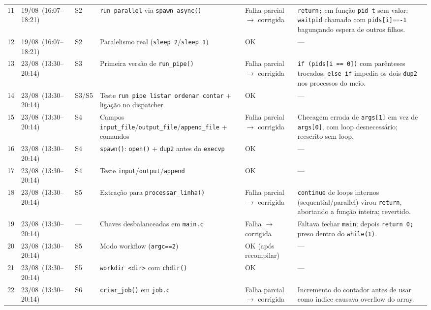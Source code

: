 \documentclass[11pt,a4paper]{article}
\begin{document}
\begin{longtable}{L{0.5cm} L{2.6cm} L{1.1cm} L{3.4cm} L{2.3cm} L{6.2cm}}
11 & 19/08\allowbreak\ (16:07--18:21) & S2 & \texttt{run parallel} via \texttt{spawn\_async()} & Falha parcial $\to$ corrigida & \texttt{return;} em função \texttt{pid\_t} sem valor; \texttt{waitpid} chamado com \texttt{pids[i]==-1} bagunçando espera de outros filhos. \\
12 & 19/08\allowbreak\ (16:07--18:21) & S2 & Paralelismo real (\texttt{sleep 2}/\texttt{sleep 1}) & OK & --- \\
13 & 23/08\allowbreak\ (13:30--20:14) & S3 & Primeira versão de \texttt{run\_pipe()} & Falha parcial $\to$ corrigida & \texttt{if (pids[i == 0])} com parênteses trocados; \texttt{else if} impedia os dois \texttt{dup2} nos processos do meio. \\
14 & 23/08\allowbreak\ (13:30--20:14) & S3/S5 & Teste \texttt{run pipe listar ordenar contar} + ligação no dispatcher & OK & --- \\
15 & 23/08\allowbreak\ (13:30--20:14) & S4 & Campos \texttt{input\_file}/\texttt{output\_file}/\texttt{append\_file} + comandos & Falha parcial $\to$ corrigida & Checagem errada de \texttt{args[1]} em vez de \texttt{args[0]}, com loop desnecessário; reescrito sem loop. \\
16 & 23/08\allowbreak\ (13:30--20:14) & S4 & \texttt{spawn()}: \texttt{open()} + \texttt{dup2} antes do \texttt{execvp} & OK & --- \\
17 & 23/08\allowbreak\ (13:30--20:14) & S4 & Teste \texttt{input}/\texttt{output}/\texttt{append} & OK & --- \\
18 & 23/08\allowbreak\ (13:30--20:14) & S5 & Extração para \texttt{processar\_linha()} & Falha parcial $\to$ corrigida & \texttt{continue} de loops internos (sequential/parallel) virou \texttt{return}, abortando a função inteira; revertido. \\
19 & 23/08\allowbreak\ (13:30--20:14) & --- & Chaves desbalanceadas em \texttt{main.c} & Falha $\to$ corrigida & Faltava fechar \texttt{main}; depois \texttt{return 0;} preso dentro do \texttt{while(1)}. \\
20 & 23/08\allowbreak\ (13:30--20:14) & S5 & Modo workflow (\texttt{argc==2}) & OK (após recompilar) & --- \\
21 & 23/08\allowbreak\ (13:30--20:14) & S5 & \texttt{workdir <dir>} com \texttt{chdir()} & OK & --- \\
22 & 23/08\allowbreak\ (13:30--20:14) & S6 & \texttt{criar\_job()} em \texttt{job.c} & Falha parcial $\to$ corrigida & Incremento do contador antes de usar como índice causava overflow do array. \\

\end{longtable}
\end{document}
